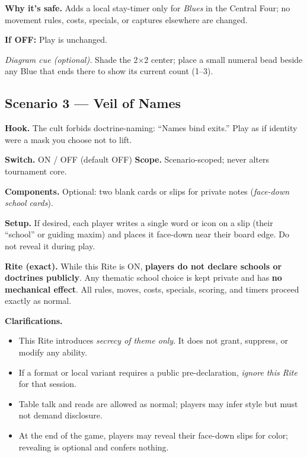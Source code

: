 \documentclass[11pt]{article}
\numberwithin{equation}{section} %
\theoremstyle{plain} %
\theoremstyle{definition} %
\theoremstyle{remark} %
\begin{document}
\medskip
\noindent\textbf{Why it’s safe.} Adds a local stay-timer only for \emph{Blues} in the Central Four; no movement rules, costs, specials, or captures elsewhere are changed.

\medskip
\noindent\textbf{If \textsc{OFF}:} Play is unchanged.

\medskip
\noindent\textit{Diagram cue (optional).} Shade the 2\(\times\)2 center; place a small numeral bead beside any Blue that ends there to show its current count (1–3).

\subsection{Scenario 3 — Veil of Names}
\label{scen:veil-of-names}

\noindent\textbf{Hook.} The cult forbids doctrine-naming: “Names bind exits.” Play as if identity were a mask you choose not to lift.

\medskip
\noindent\textbf{Switch.} \textsc{ON / OFF} (default \textsc{OFF}) \hfill \textbf{Scope.} Scenario-scoped; never alters tournament core.

\medskip
\noindent\textbf{Components.} Optional: two blank cards or slips for private notes (\emph{face-down school cards}).

\medskip
\noindent\textbf{Setup.} If desired, each player writes a single word or icon on a slip (their “school” or guiding maxim) and places it face-down near their board edge. Do not reveal it during play.

\medskip
\noindent\textbf{Rite (exact).} While this Rite is \textsc{ON}, \textbf{players do not declare schools or doctrines publicly}. Any thematic school choice is kept private and has \textbf{no mechanical effect}. All rules, moves, costs, specials, scoring, and timers proceed exactly as normal.

\medskip
\noindent\textbf{Clarifications.}
\begin{itemize}\setlength\itemsep{0.25em}
  \item This Rite introduces \emph{secrecy of theme only}. It does not grant, suppress, or modify any ability.
  \item If a format or local variant requires a public pre-declaration, \emph{ignore this Rite} for that session.
  \item Table talk and reads are allowed as normal; players may infer style but must not demand disclosure.
  \item At the end of the game, players may reveal their face-down slips for color; revealing is optional and confers nothing.
\end{itemize}
\end{document}
